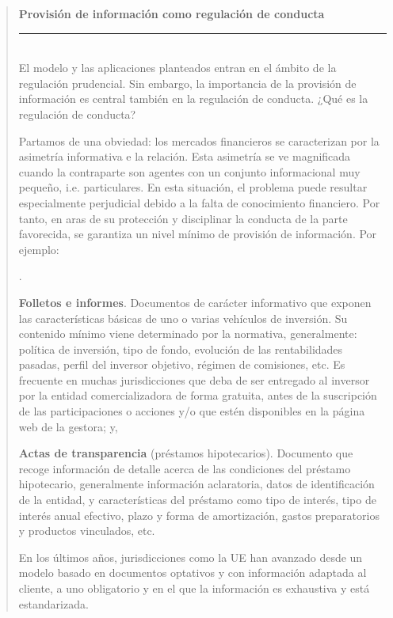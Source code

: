 \documentclass[10pt,a4paper]{article}
\newcounter{numitem}
\newenvironment{lnum}
      {\begin{list}{\arabic{numitem}.}{%
          \usecounter{numitem}%
          \setlength{\leftmargin}{1cm}%
          \setlength{\parskip}{3pt}%
          \setlength{\itemsep}{0pt}%
          \setlength{\parsep}{0pt}%
      }}
      {\end{list}}
\newenvironment{specialblock}[1]{%
      \begin{quote} %
      \small %
      \noindent\textbf{#1}\\[-0.3em] %
      \rule{\linewidth}{0.4pt}\\[0.6em]}{
      \end{quote}}
\begin{document}
\begin{specialblock}{Provisión de información como regulación de conducta}
    El modelo y las aplicaciones planteados entran en el ámbito de la regulación prudencial. Sin embargo, la importancia de la provisión de información es central también en la regulación de conducta. ¿Qué es la regulación de conducta?
    
    Partamos de una obviedad: los mercados financieros se caracterizan por la asimetría informativa e la relación. Esta asimetría se ve magnificada cuando la contraparte son agentes con un conjunto informacional muy pequeño, i.e. particulares. En esta situación, el problema puede resultar especialmente perjudicial debido a la falta de conocimiento financiero. Por tanto, en aras de su protección y disciplinar la conducta de la parte favorecida, se garantiza un nivel mínimo de provisión de información. Por ejemplo: 
    \begin{lnum}
        \item \textbf{Folletos e informes}. Documentos de carácter informativo que exponen las características básicas de uno o varias vehículos de inversión. Su contenido mínimo viene determinado por la normativa, generalmente: política de inversión, tipo de fondo, evolución de las rentabilidades pasadas, perfil del inversor objetivo, régimen de comisiones, etc. Es frecuente en muchas jurisdicciones que deba de ser entregado al inversor por la entidad comercializadora de forma gratuita, antes de la suscripción de las participaciones o acciones y/o que estén disponibles en la página web de la gestora; y,
        \item \textbf{Actas de transparencia} (préstamos hipotecarios). Documento que recoge información de detalle acerca de las condiciones del préstamo hipotecario, generalmente información aclaratoria, datos de identificación de la entidad, y características del préstamo como tipo de interés, tipo de interés anual efectivo, plazo y forma de amortización, gastos preparatorios y productos vinculados, etc. 
    \end{lnum}
    En los últimos años, jurisdicciones como la UE han avanzado desde un modelo basado en documentos optativos y con información adaptada al cliente, a uno obligatorio y en el que la información es exhaustiva y está estandarizada.
\end{specialblock}
\end{document}
